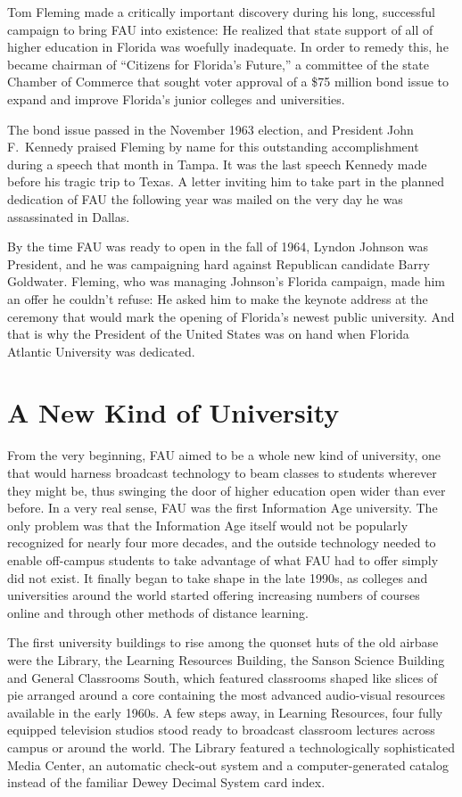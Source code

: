 \documentclass{article}
\begin{document}
Tom Fleming made a critically important discovery during his long, successful campaign to bring FAU into existence: He realized that state support of all of higher education in Florida was woefully inadequate.  In order to remedy this, he became chairman of ``Citizens for Florida's Future,'' a committee of the state Chamber of Commerce that sought voter approval of a \$75 million bond issue to expand and improve Florida's junior colleges and universities.

The bond issue passed in the November 1963 election, and President John F.\ Kennedy praised Fleming by name for this outstanding accomplishment during a speech that month in Tampa.  It was the last speech Kennedy made before his tragic trip to Texas.  A letter inviting him to take part in the planned dedication of FAU the following year was mailed on the very day he was assassinated in Dallas.

By the time FAU was ready to open in the fall of 1964, Lyndon Johnson was President, and he was campaigning hard against Republican candidate Barry Goldwater.  Fleming, who was managing Johnson's Florida campaign, made him an offer he couldn't refuse: He asked him to make the keynote address at the ceremony that would mark the opening of Florida's newest public university.  And that is why the President of the United States was on hand when Florida Atlantic University was dedicated.

\section{A New Kind of University}

From the very beginning, FAU aimed to be a whole new kind of university, one that would harness broadcast technology to beam classes to students wherever they might be, thus swinging the door of higher education open wider than ever before.  In a very real sense, FAU was the first Information Age university.  The only problem was that the Information Age itself would not be popularly recognized for nearly four more decades, and the outside technology needed to enable off-campus students to take advantage of what FAU had to offer simply did not exist.  It finally began to take shape in the late 1990s, as colleges and universities around the world started offering increasing numbers of courses online and through other methods of distance learning.

The first university buildings to rise among the quonset huts of the old airbase were the Library, the Learning Resources Building, the Sanson Science Building and General Classrooms South, which featured classrooms shaped like slices of pie arranged around a core containing the most advanced audio-visual resources available in the early 1960s.  A few steps away, in Learning Resources, four fully equipped television studios stood ready to broadcast classroom lectures across campus or around the world.  The Library featured a technologically sophisticated Media Center, an automatic check-out system and a computer-generated catalog instead of the familiar Dewey Decimal System card index.
\end{document}

